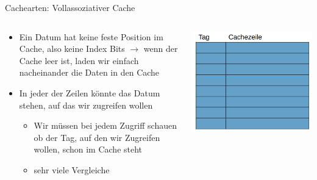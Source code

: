 \documentclass[
  german,            %
  aspectratio=169,    %
]{tumbeamer}
\begin{document}
\begin{frame}[c]{Cachearten: Vollassoziativer Cache}{}
  \begin{columns}[c]
    \begin{column}{0.5\textwidth}
      \begin{itemize}
        \item Ein Datum hat keine feste Position im Cache, also keine Index Bits $\rightarrow$ wenn der Cache leer ist, laden wir einfach nacheinander die Daten in den Cache
        \item In jeder der Zeilen könnte das Datum stehen, auf das wir zugreifen wollen
        \begin{itemize}
          \item Wir müssen bei jedem Zugriff schauen ob der Tag, auf den wir Zugreifen wollen, schon im Cache steht 
          \item sehr viele Vergleiche 
        \end{itemize}
      \end{itemize}
    \end{column}
    \begin{column}{0.5\textwidth}
      \includegraphics[width=\linewidth]{w05_vollassoz_rep.png}
    \end{column}
  \end{columns}
\end{frame}
\end{document}
